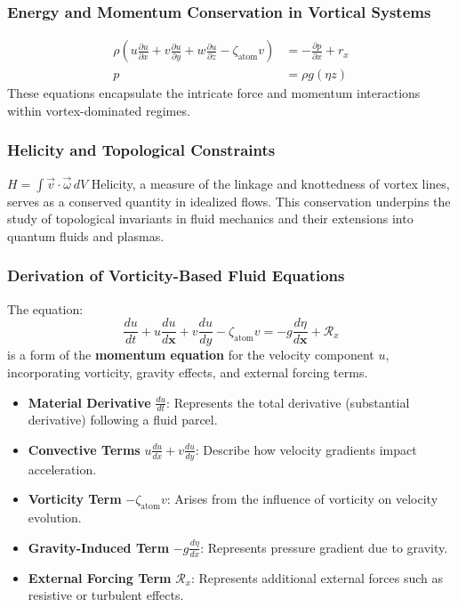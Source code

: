 \documentclass[12pt]{article}
\begin{document}
    \subsubsection*{Energy and Momentum Conservation in Vortical Systems}
    \begin{align}
        \rho \left( u \frac{\partial u}{\partial x} + v \frac{\partial u}{\partial y} + w \frac{\partial u}{\partial z} - \zeta_\text{atom} v \right) &= -\frac{\partial p}{\partial x} + r_x \\
        p &= \rho g(\eta z)
    \end{align}
    These equations encapsulate the intricate force and momentum interactions within vortex-dominated regimes.


\subsubsection*{Helicity and Topological Constraints}
$H = \int \vec{v} \cdot \vec{\omega} \, dV$
 Helicity, a measure of the linkage and knottedness of vortex lines, serves as a conserved quantity in idealized flows. This conservation underpins the study of topological invariants in fluid mechanics and their extensions into quantum fluids and plasmas.


    \subsubsection*{Derivation of Vorticity-Based Fluid Equations}
    The equation:
    \begin{equation*}
        \frac{d u}{d t}+u \frac{d u}{d \boldsymbol{x}}+v \frac{d u}{d y}-\zeta_{\text {atom}} v=-g \frac{d \eta}{d \boldsymbol{x}}+\mathcal{R}_x
    \end{equation*}
    is a form of the \textbf{momentum equation} for the velocity component $u$, incorporating vorticity, gravity effects, and external forcing terms.

    \begin{itemize}
        \item \textbf{Material Derivative} $\frac{d u}{d t}$: Represents the total derivative (substantial derivative) following a fluid parcel.
        \item \textbf{Convective Terms} $u \frac{d u}{dx} + v \frac{d u}{dy}$: Describe how velocity gradients impact acceleration.
        \item \textbf{Vorticity Term} $-\zeta_\text{atom} v$: Arises from the influence of vorticity on velocity evolution.
        \item \textbf{Gravity-Induced Term} $-g \frac{d \eta}{d x}$: Represents pressure gradient due to gravity.
        \item \textbf{External Forcing Term} $\mathcal{R}_x$: Represents additional external forces such as resistive or turbulent effects.
    \end{itemize}
\end{document}

